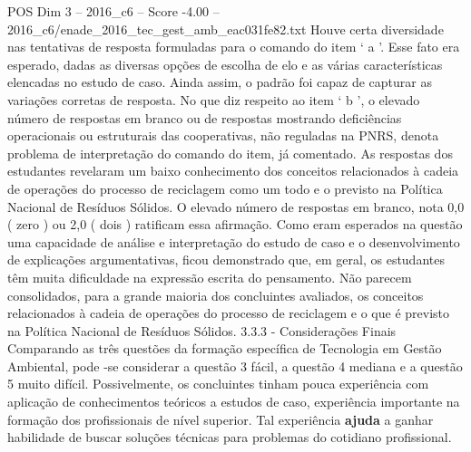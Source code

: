 \begin{textsample}{POS Dim 3 – 2016\_c6 – Score -4.00 – 2016\_c6/enade\_2016\_tec\_gest\_amb\_eac031fe82.txt}
Houve certa diversidade nas tentativas de resposta formuladas para o comando do item ‘ a ’.
Esse fato era esperado, dadas as diversas opções de escolha de elo e as várias características elencadas no estudo de caso.
Ainda assim, o padrão foi capaz de capturar as variações corretas de resposta.
No que diz respeito ao item ‘ b ’, o elevado número de respostas em branco ou de respostas mostrando deficiências operacionais ou estruturais das cooperativas, não reguladas na PNRS, denota problema de interpretação do comando do item, já comentado.
As respostas dos estudantes revelaram um baixo conhecimento dos conceitos relacionados à cadeia de operações do processo de reciclagem como um todo e o previsto na Política Nacional de Resíduos Sólidos.
O elevado número de respostas em branco, nota 0,0 ( zero ) ou 2,0 ( dois ) ratificam essa afirmação.
Como eram esperados na questão uma capacidade de análise e interpretação do estudo de caso e o desenvolvimento de explicações argumentativas, ficou demonstrado que, em geral, os estudantes têm muita dificuldade na expressão escrita do pensamento.
Não parecem consolidados, para a grande maioria dos concluintes avaliados, os conceitos relacionados à cadeia de operações do processo de reciclagem e o que é previsto na Política Nacional de Resíduos Sólidos. 3.3.3 - Considerações Finais Comparando as três questões da formação específica de Tecnologia em Gestão Ambiental, pode -se considerar a questão 3 fácil, a questão 4 mediana e a questão 5 muito difícil.
Possivelmente, os concluintes tinham pouca experiência com aplicação de conhecimentos teóricos a estudos de caso, experiência importante na formação dos profissionais de nível superior.
Tal experiência \textbf{ajuda} a ganhar habilidade de buscar soluções técnicas para problemas do cotidiano profissional.

\end{textsample}
